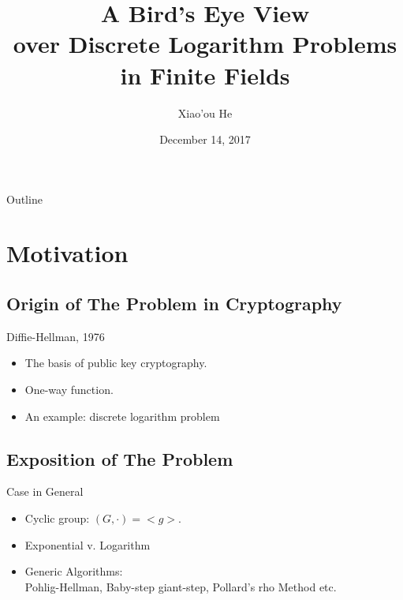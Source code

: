 \documentclass{beamer}
\title[Short Paper Title] %
{A Bird's Eye View\\over Discrete Logarithm Problems\\in Finite Fields}
\author[He] %
{Xiao'ou He}
\institute[Universities of Somewhere and Elsewhere] %
{
Key Laboratory of Mathematics Mechanization, AMSS}
\date[Annual 2017] %
{December 14, 2017}
\begin{document}
\begin{frame}
  \titlepage
\end{frame}

\begin{frame}{Outline}
  \tableofcontents
\end{frame}





\section{Motivation}

	\subsection{Origin of The Problem in Cryptography}
		\begin{frame}{Diffie-Hellman, 1976}
	
			\begin{itemize}
				\item
				The basis of public key cryptography.
				\item
					One-way function.
				\item
					An example: discrete logarithm problem
			\end{itemize}
		\end{frame}

	\subsection{Exposition of The Problem}
		\begin{frame}{Case in General}
			\begin{itemize}
				\item
					Cyclic group: $(G, \cdot) = <g>$.
				\item
					Exponential v. Logarithm
				\item
					Generic Algorithms:\\
					Pohlig-Hellman, Baby-step giant-step, Pollard's rho Method etc.		
			\end{itemize}
		\end{frame}
		
\end{document}
